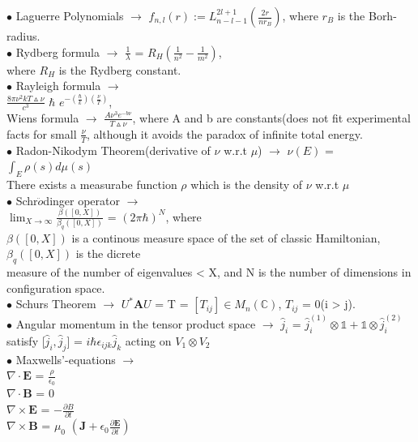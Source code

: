 \documentclass[10pt,fancy]{elegantbook}
\begin{document}
{$\bullet$ Laguerre Polynomials $\longrightarrow$ $f_{n,l}(r) := L_{n - l - 1}^{2l +  1}$$ \left( \frac{2r}{nr_B} \right)$, where $r_B$ is the Borh-radius.  \\

$\bullet$ Rydberg formula $\longrightarrow$ $\frac{1}{\lambda}$ = $R_H \left({\frac{1}{n^2} - \frac{1}{m^2}} \right)$,  \\  
where $R_H$ is the Rydberg constant. \\

$\bullet$ Rayleigh formula $\longrightarrow$  \\ 
 $\frac{8\pi\nu^2{kT}\vartriangle\nu}{c^3}$ $\hbar$ $e^{-\left(\frac{\hbar}{k}\right) \left(\frac{\nu}{T} \right)}$,  \\   
Wiens formula $\longrightarrow$ $\frac{A \nu^3 e^{-b \nu}}{T \vartriangle \nu}$, where A and b are constants(does not fit experimental facts for small $\frac{ \nu}{T}$, although it avoids the paradox of infinite total energy.  \\


$\bullet$ Radon-Nikodym Theorem(derivative of $\nu$ w.r.t $\mu$) $\longrightarrow$ $\nu (E)$ = $\int_E \rho(s) d\mu(s)$ \\ 
There exists a measurabe function $\rho$ which is the density of $\nu$ w.r.t $\mu$ \\

$\bullet$ Schr$\ddot{o}$dinger operator $\longrightarrow$  \\ 
$\lim_{X \to \infty} \frac{\beta([0,X])}{\beta_q([0,X])}$ = $(2 \pi \hbar)^N$, where \\
$\beta([0,X])$ is a continous measure space of the set of classic Hamiltonian, $\beta_q([0,X])$ is the dicrete  \\
measure of the number of eigenvalues < X, and N is the number of dimensions in configuration space.  \\

$\bullet$ Schurs Theorem $\longrightarrow$ $U^*{\mathbf A}U$ = T = $[T_{ij}] \in M_n(\mathbb C)$, $T_{ij}$ = 0(i > j). \\

$\bullet$ Angular momentum in the tensor product space $\longrightarrow$ $\hat j_i$ = ${\hat j_i^{(1)}} \otimes \mathbb 1 + \mathbb 1 \otimes  {\hat j_i^{(2)}}$  satisfy [$\hat j_i, \hat j_j$] = ${i \hbar \epsilon_{ijk} {\hat j_k}}$ acting on $V_1 \otimes V_2$ \\

$\bullet$ Maxwells'-equations $\longrightarrow$  \\  
$\nabla \cdot \mathbf E$ = $ \frac{\rho}{\epsilon_0}$ \\ 
$\nabla \cdot \mathbf B$ = 0  \\
$\nabla \times \mathbf E$ = $ - \frac{\partial B}{\partial t}$ \\ 
$\nabla \times \mathbf B$ = $\mu_0$  $\left( \mathbf {J} + \epsilon_0 \frac{\partial \mathbf E}{\partial t} \right)$  \\

}
\end{document}
